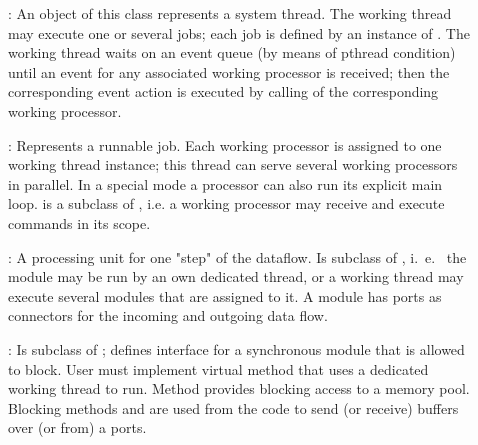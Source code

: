 \begin{description}
\item[] :  
An object of this class represents a system thread. 
   The working thread may execute one or several jobs; each job is defined 
   by an instance of . The working thread waits on an 
   event queue (by means of pthread condition) until an event for any 
   associated working processor is received; then the corresponding event action is 
   executed by calling  of the corresponding working processor.

\item[] :   
   Represents a runnable job. Each 
   working processor is assigned to one working thread instance; 
   this thread can serve several working processors in parallel.
   In a special mode a processor can also run its explicit main loop.  
    is a subclass of , 
   i.e. a working processor may receive and execute commands in its scope. 

\item[] :  
A processing unit for one "step" of the dataflow. 
   Is subclass of , i.~e.~ the module may be run by an own 
   dedicated thread, or a working thread may execute several modules that 
   are assigned to it. A module has ports as connectors for the 
   incoming and outgoing data flow.   

\item[] : 
Is subclass of ; defines interface for a 
   synchronous module that is allowed to block. User must implement virtual 
   method  that uses a dedicated working thread to run. 
   Method  provides blocking access to a memory pool. 
   Blocking methods  and
     are used from the  
    code to send (or receive) buffers over (or from) a ports.  


\end{description}
